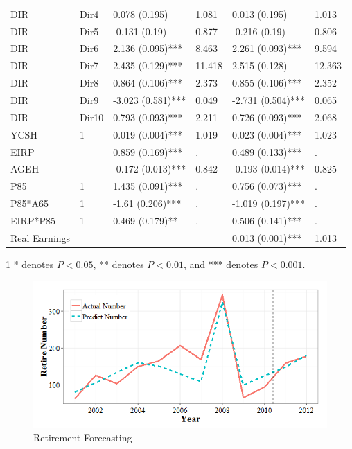 \documentclass[12pt,letterpaper]{article}
\begin{document}
\begin{table}[htbp]
\begin{threeparttable}
\begin{tabular}{llL{2.5cm}L{1.5cm}L{2.5cm}L{1.5cm}}
               DIR & Dir4  & 0.078 (0.195) & 1.081 & 0.013 (0.195) & 1.013 \\
               DIR & Dir5  & -0.131 (0.19) & 0.877 & -0.216 (0.19) & 0.806 \\
               DIR & Dir6  & 2.136 (0.095)*** & 8.463 & 2.261 (0.093)*** & 9.594 \\
               DIR & Dir7  & 2.435 (0.129)*** & 11.418 & 2.515 (0.128) & 12.363 \\
               DIR & Dir8  & 0.864 (0.106)*** & 2.373 & 0.855 (0.106)*** & 2.352 \\
               DIR & Dir9  & -3.023 (0.581)*** & 0.049 & -2.731 (0.504)*** & 0.065 \\
               DIR & Dir10 & 0.793 (0.093)*** & 2.211 & 0.726 (0.093)*** & 2.068 \\
               YCSH  & 1     & 0.019 (0.004)*** & 1.019 & 0.023 (0.004)*** & 1.023 \\
               EIRP  &       & 0.859 (0.169)*** & .     & 0.489 (0.133)*** & . \\
               AGEH  &       & -0.172 (0.013)*** & 0.842 & -0.193 (0.014)*** & 0.825 \\
               P85   & 1     & 1.435 (0.091)*** & .     & 0.756 (0.073)*** & . \\
               P85*A65 & 1     & -1.61 (0.206)*** & .     & -1.019 (0.197)*** & . \\
               EIRP*P85 & 1     & 0.469 (0.179)** & .     & 0.506 (0.141)*** & . \\
               Real Earnings &       &       &       & 0.013 (0.001)*** & 1.013 \\
               \bottomrule
		\end{tabular}%
		\begin{tablenotes}
			\item[1] * denotes $P<0.05$, ** denotes $P<0.01$, and *** denotes $P<0.001$.
		\end{tablenotes}
	\end{threeparttable}
	\label{tab:paraest.}%
 \end{table}%
\begin{figure}[h!]
	\centering
	\includegraphics[width=5in]{retire2.png}
	\caption{Retirement Forecasting}
	\label{fig:predict}	
	
\end{figure}
\end{document}
